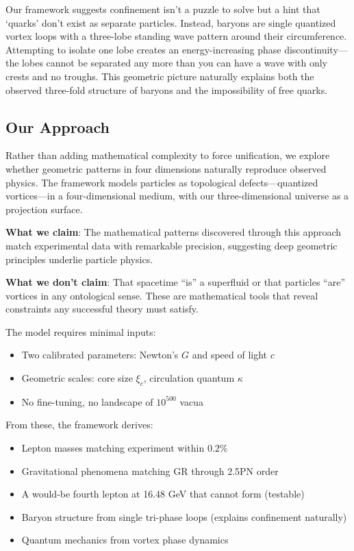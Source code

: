 Our framework suggests confinement isn't a puzzle to solve but a hint that `quarks' don't exist as separate particles. Instead, baryons are single quantized vortex loops with a three-lobe standing wave pattern around their circumference. Attempting to isolate one lobe creates an energy-increasing phase discontinuity---the lobes cannot be separated any more than you can have a wave with only crests and no troughs. This geometric picture naturally explains both the observed three-fold structure of baryons and the impossibility of free quarks.

\subsection{Our Approach}

Rather than adding mathematical complexity to force unification, we explore whether geometric patterns in four dimensions naturally reproduce observed physics. The framework models particles as topological defects---quantized vortices---in a four-dimensional medium, with our three-dimensional universe as a projection surface.

\textbf{What we claim}: The mathematical patterns discovered through this approach match experimental data with remarkable precision, suggesting deep geometric principles underlie particle physics.

\textbf{What we don't claim}: That spacetime ``is'' a superfluid or that particles ``are'' vortices in any ontological sense. These are mathematical tools that reveal constraints any successful theory must satisfy.

The model requires minimal inputs:
\begin{itemize}
\item Two calibrated parameters: Newton's $G$ and speed of light $c$
\item Geometric scales: core size $\xi_c$, circulation quantum $\kappa$
\item No fine-tuning, no landscape of $10^{500}$ vacua
\end{itemize}

From these, the framework derives:
\begin{itemize}
\item Lepton masses matching experiment within $0.2\%$
\item Gravitational phenomena matching GR through 2.5PN order
\item A would-be fourth lepton at 16.48 GeV that cannot form (testable)
\item Baryon structure from single tri-phase loops (explains confinement naturally)
\item Quantum mechanics from vortex phase dynamics
\end{itemize}

